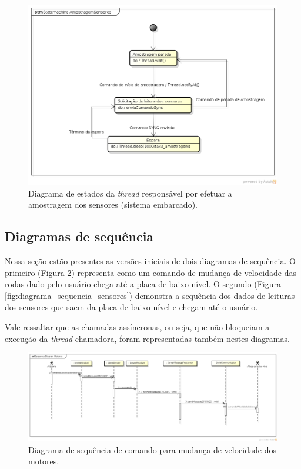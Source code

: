 \begin{figure}[H]
  \centering
  \includegraphics[width=\textwidth, keepaspectratio]{./figuras/diagrama_estados_amostragem_sensores.png}
  \caption{Diagrama de estados da \textit{thread} responsável por efetuar a amostragem dos sensores (sistema embarcado).}
  \label{fig:diagrama_estados_amostragem_sensores}
\end{figure}



\subsection{Diagramas de sequência}

Nessa seção estão presentes as versões iniciais de dois diagramas de sequência. O primeiro (Figura \ref{fig:diagrama_sequencia_motores}) representa como um comando de mudança de velocidade das rodas dado pelo usuário chega até a placa de baixo nível. O segundo (Figura \ref{fig:diagrama_sequencia_sensores}) demonstra a sequência dos dados de leituras dos sensores que saem da placa de baixo nível e chegam até o usuário. 

Vale ressaltar que as chamadas assíncronas, ou seja, que não bloqueiam a execução da \textit{thread} chamadora, foram representadas também nestes diagramas.

\begin{figure}[H]
  \centering
  \includegraphics[width=\textwidth, keepaspectratio]{./figuras/diagrama_sequencia_motores.png}
  \caption{Diagrama de sequência de comando para mudança de velocidade dos motores.}
  \label{fig:diagrama_sequencia_motores}
\end{figure}

